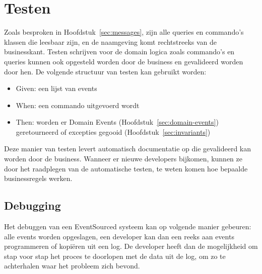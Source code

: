 
\section{Testen}
\label{sec:testen}

Zoals besproken in Hoofdstuk~\ref{sec:messages}, zijn alle queries en commando’s klassen die leesbaar zijn, en de naamgeving komt rechtstreeks van de businesskant. Testen schrijven voor de domain logica zoals commando’s en queries kunnen ook opgesteld worden door de business en gevalideerd worden door hen.
De volgende structuur van testen kan gebruikt worden:

\begin{itemize}
  \item{Given: een lijst van events}
  \item{When: een commando uitgevoerd wordt}
  \item{Then: worden er Domain Events (Hoofdstuk~\ref{sec:domain-events}) geretourneerd of excepties gegooid (Hoofdstuk~\ref{sec:invariants})}
\end{itemize}

Deze manier van testen levert automatisch documentatie op die gevalideerd kan worden door de business.
Wanneer er nieuwe developers bijkomen, kunnen ze door het raadplegen van de automatische testen, te weten komen hoe bepaalde businessregels werken.

\subsection{Debugging}
\label{subsec:debugging}

Het debuggen van een EventSourced systeem kan op volgende manier gebeuren: alle events worden opgeslagen, een developer kan dan een reeks aan events programmeren of kopiëren uit een \gls{log}. De developer heeft dan de mogelijkheid om stap voor stap het proces te doorlopen met de data uit de \gls{log}, om zo te achterhalen waar het probleem zich bevond.